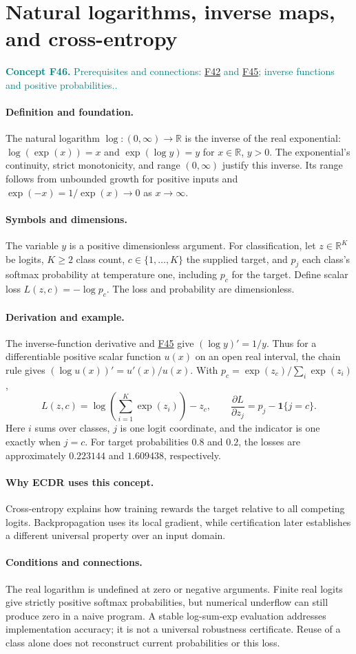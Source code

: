 \documentclass[11pt,a4paper]{article}
\newcommand{\R}{\mathbb R}
\newcommand{\conceptid}{Front matter}
\newcommand{\concept}[3]{\clearpage\renewcommand{\conceptid}{#1}%
\section{#2}\label{concept:#1}%
\textcolor{teal}{\textbf{Concept #1.} Prerequisites and connections: #3.}\par
\typeout{ECDR-CONCEPT-START #1 PAGE=\thepage}}
\begin{document}
\concept{F46}{Natural logarithms, inverse maps, and cross-entropy}{\hyperref[concept:F42]{F42} and \hyperref[concept:F45]{F45}; inverse functions and positive probabilities.}
\paragraph{Definition and foundation.}
The natural logarithm $\log:(0,\infty)\to\R$ is the inverse of the real exponential: $\log(\exp(x))=x$ and $\exp(\log y)=y$ for $x\in\R$, $y>0$. The exponential's continuity, strict monotonicity, and range $(0,\infty)$ justify this inverse. Its range follows from unbounded growth for positive inputs and $\exp(-x)=1/\exp(x)\to0$ as $x\to\infty$.
\paragraph{Symbols and dimensions.}
The variable $y$ is a positive dimensionless argument. For classification, let $z\in\R^K$ be logits, $K\ge2$ class count, $c\in\{1,\ldots,K\}$ the supplied target, and $p_j$ each class's softmax probability at temperature one, including $p_c$ for the target. Define scalar loss $L(z,c)=-\log p_c$. The loss and probability are dimensionless.
\paragraph{Derivation and example.}
The inverse-function derivative and \hyperref[concept:F45]{F45} give $(\log y)'=1/y$. Thus for a differentiable positive scalar function $u(x)$ on an open real interval, the chain rule gives $(\log u(x))'=u'(x)/u(x)$. With $p_c=\exp(z_c)/\sum_i\exp(z_i)$,
\[
 L(z,c)=\log\!\left(\sum_{i=1}^{K}\exp(z_i)\right)-z_c,
 \qquad
 \frac{\partial L}{\partial z_j}=p_j-\mathbf1\{j=c\}.
\]
Here $i$ sums over classes, $j$ is one logit coordinate, and the indicator is one exactly when $j=c$. For target probabilities $0.8$ and $0.2$, the losses are approximately $0.223144$ and $1.609438$, respectively.
\paragraph{Why ECDR uses this concept.}
Cross-entropy explains how training rewards the target relative to all competing logits. Backpropagation uses its local gradient, while certification later establishes a different universal property over an input domain.
\paragraph{Conditions and connections.}
The real logarithm is undefined at zero or negative arguments. Finite real logits give strictly positive softmax probabilities, but numerical underflow can still produce zero in a naive program. A stable log-sum-exp evaluation addresses implementation accuracy; it is not a universal robustness certificate. Reuse of a class alone does not reconstruct current probabilities or this loss.
\par\label{endconcept:F46}
\end{document}
